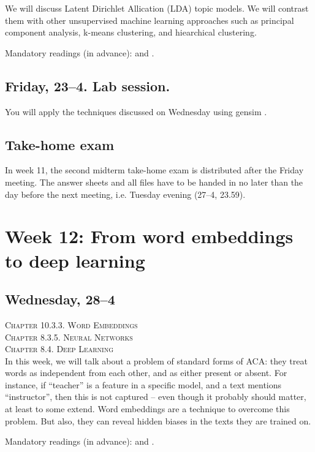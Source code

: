 We will discuss Latent Dirichlet Allication (LDA) topic models. We will contrast them with other unsupervised machine learning approaches such as principal component analysis, k-means clustering, and hiearchical clustering.

Mandatory readings (in advance): \cite{Maier2018a} and \cite{Tsur2015}.

\subsection*{Friday, 23--4. Lab session.}
You will apply the techniques discussed on Wednesday using gensim \citep{Rehurek2010}.


\subsection*{Take-home exam}
In week 11, the second midterm take-home exam is distributed after the Friday meeting. The answer sheets and all files have to be handed in no later than the day before the next meeting, i.e. Tuesday evening (27--4, 23.59).





\section*{Week 12: From word embeddings to deep learning}

\subsection*{Wednesday, 28--4}
\textsc{ Chapter 10.3.3. Word Embeddings}\\
\textsc{ Chapter 8.3.5. Neural Networks}\\
\textsc{ Chapter 8.4. Deep Learning}\\

In this week, we will talk about a problem of standard forms of ACA: they treat words as independent from each other, and as either present or absent. For instance, if ``teacher'' is a feature in a specific model, and a text mentions ``instructor'', then this is not captured -- even though it probably should matter, at least to some extend. Word embeddings are a technique to overcome this problem. But also, they can reveal hidden biases in the texts they are trained on.

Mandatory readings (in advance): \cite{Kusner2015} and \cite{Garg2017}.


